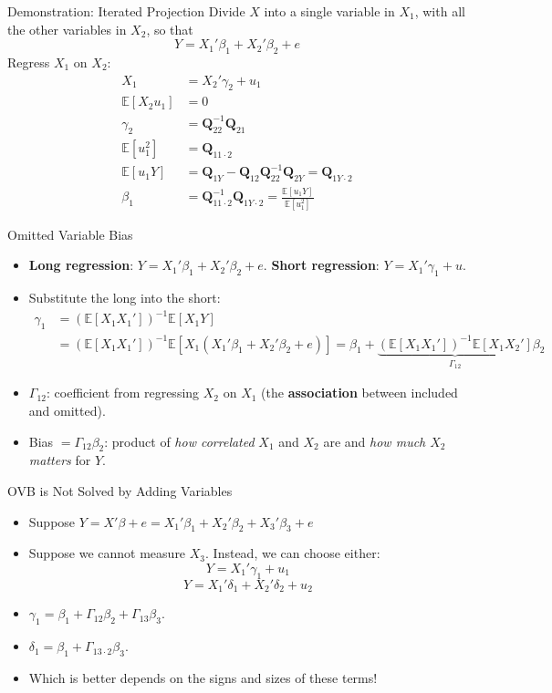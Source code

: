 \documentclass[aspectratio=169]{beamer}
\numberwithin{equation}{section}
\begin{document}
\begin{frame}{Demonstration: Iterated Projection}
Divide $X$ into a single variable in $X_1$, with all the other variables in $X_2$, so that
$$Y=X_1'\beta_1+X_2'\beta_2+e$$
Regress $X_1$ on $X_2$:
\begin{align*}
X_1&=X_2'\gamma_2+u_1\\
\mathbb{E}[X_2u_1]&=0\\
\gamma_2&=\mathbf{Q}_{22}^{-1} \mathbf{Q}_{21}\\
\mathbb{E}[u_1^2]&=\mathbf{Q}_{11\cdot 2}\\
\mathbb{E}[u_1Y]&=\mathbf{Q}_{1Y}-\mathbf{Q}_{12}\mathbf{Q}^{-1}_{22}\mathbf{Q}_{2Y}=\mathbf{Q}_{1Y\cdot2}\\
\beta_1&=\mathbf{Q}_{11\cdot 2}^{-1} \mathbf{Q}_{1Y\cdot 2}=\frac{\mathbb{E}[u_1Y]}{\mathbb{E}[u_1^2]}
\end{align*}
\end{frame}

\begin{frame}{Omitted Variable Bias}
\begin{itemize}
\item \textbf{Long regression}: $Y=X_1'\beta_1+X_2'\beta_2+e$. \quad \textbf{Short regression}: $Y=X_1'\gamma_1+u$.
\pause
\item Substitute the long into the short:
\begin{align*}
\gamma_1&=(\mathbb{E}[X_1X_1'])^{-1}\mathbb{E}[X_1Y]\\
&=(\mathbb{E}[X_1X_1'])^{-1}\mathbb{E}[X_1(X_1'\beta_1+X_2'\beta_2+e)]
=\beta_1+\underbrace{(\mathbb{E}[X_1X_1'])^{-1}\mathbb{E}[X_1X_2']}_{\Gamma_{12}}\beta_2
\end{align*}
\pause
\item $\Gamma_{12}$: coefficient from regressing $X_2$ on $X_1$ (the \textbf{association} between included and omitted).
\item \alert{Bias} $= \Gamma_{12}\beta_2$: product of \emph{how correlated} $X_1$ and $X_2$ are and \emph{how much $X_2$ matters} for $Y$.
\end{itemize}
\end{frame}


\begin{frame}{OVB is Not Solved by Adding Variables}
\begin{itemize}
\item Suppose $Y=X'\beta+e=X_1'\beta_1+X_2'\beta_2+X_3'\beta_3+e$
\item Suppose we cannot measure $X_3$.  Instead, we can choose either:
$$Y=X_1'\gamma_1+u_1$$
$$Y=X_1'\delta_1+X_2'\delta_2+u_2$$
\item $\gamma_1=\beta_1+\Gamma_{12}\beta_2+\Gamma_{13}\beta_3$.
\item $\delta_1=\beta_1+\Gamma_{13\cdot 2}\beta_3$.
\item Which is better depends on the signs and sizes of these terms!
\end{itemize}
\end{frame}
\end{document}
